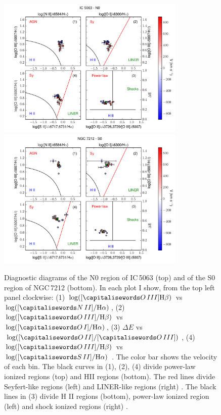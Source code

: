 \documentclass[../thesis.tex]{subfiles}
\begin{document}
\begin{figure} 
\centering
\includegraphics[width=0.8\textwidth]{images/paper1/IC5063_n0_diag.pdf}\\
\includegraphics[width=0.8\textwidth]{images/paper1/NGC7212_s0_diag.pdf}\\
\caption[]{Diagnostic diagrams of the N0 region of IC\,5063 (top) and of the S0 region of NGC\,7212 (bottom).  In each plot I show, from the top left panel clockwise: (1) $\log([\ion{O}{III}] \Hb)$ vs $\log([\ion{N}{II}]/ \Ha)$, (2) $\log([\ion{O}{III}]/ \Hb)$ vs $\log([\ion{O}{I}]/ \Ha)$, (3) $\Delta E$ vs $\log([\ion{O}{II}]/[\ion{O}{III}])$, (4) $\log([\ion{O}{III}]/ \Hb)$ vs $\log([\ion{S}{II}]/ \Ha)$ \citep{Baldwin81, Veilleux87}. The color bar shows the velocity of each bin. The black curves in (1), (2), (4) divide power-law ionized regions (top) and HII regions (bottom). The red lines divide Seyfert-like regions (left) and LINER-like regions (right) \citep{Kewley06}. The black lines in (3) divide H II regions (bottom), power-law ionized region (left) and shock ionized regions (right) \citep{Baldwin81}.  }
\label{fig:diag_es}
\end{figure}
\end{document}
